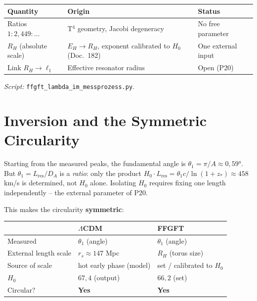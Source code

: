 \begin{center}
\begin{tabular}{p{3.5cm}p{4.5cm}p{3cm}}
\toprule
\textbf{Quantity} & \textbf{Origin} & \textbf{Status} \\
\midrule
Ratios $1:2{,}449:\ldots$ &
  T$^4$ geometry, Jacobi degeneracy &
  No free parameter \\
\addlinespace
$R_H$ (absolute scale) &
  $E_H \to R_H$, exponent calibrated to $H_0$ (Doc.~182) &
  One external input \\
\addlinespace
Link $R_H \to \ell_1$ &
  Effective resonator radius &
  Open (P20) \\
\bottomrule
\end{tabular}
\end{center}

\emph{Script:} \texttt{ffgft\_lambda\_im\_messprozess.py}.

\section{Inversion and the Symmetric Circularity}

Starting from the measured peaks, the fundamental angle is
$\theta_1 = \pi/A \approx 0{,}59°$. But $\theta_1 = L_\mathrm{res}/D_A$ is a
\emph{ratio}: only the product $H_0 \cdot L_\mathrm{res} = \theta_1 c/\ln(1+z_*)
\approx 458$ km/s is determined, not $H_0$ alone. Isolating $H_0$ requires
fixing one length independently -- the external parameter of P20.

This makes the circularity \textbf{symmetric}:

\begin{center}
\begin{tabular}{p{3.5cm}p{4cm}p{4cm}}
\toprule
 & \textbf{$\Lambda$CDM} & \textbf{FFGFT} \\
\midrule
Measured & $\theta_1$ (angle) & $\theta_1$ (angle) \\
External length scale & $r_s \approx 147$ Mpc & $R_H$ (torus size) \\
Source of scale & hot early phase (model) & set / calibrated to $H_0$ \\
$H_0$ & $67{,}4$ (output) & $66{,}2$ (set) \\
Circular? & \textbf{Yes} & \textbf{Yes} \\
\bottomrule
\end{tabular}
\end{center}

